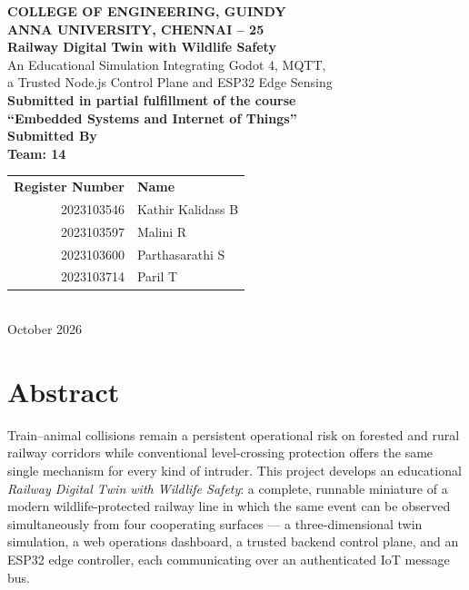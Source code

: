 \begin{titlepage}
\begin{center}

{\large\bfseries COLLEGE OF ENGINEERING, GUINDY}\\[2pt]
{\normalsize\bfseries ANNA UNIVERSITY, CHENNAI -- 25}\\[26pt]

{\Large\bfseries Railway Digital Twin with Wildlife Safety}\\[4pt]
{\normalsize An Educational Simulation Integrating Godot 4, MQTT,\\ a Trusted Node.js Control Plane and ESP32 Edge Sensing}\\[26pt]

{\normalsize\bfseries Submitted in partial fulfillment of the course}\\[2pt]
{\normalsize\bfseries ``Embedded Systems and Internet of Things''}\\[26pt]

{\normalsize\bfseries Submitted By}\\[4pt]
\textbf{Team: 14}\\[10pt]
{\renewcommand{\arraystretch}{1.35}%
\begin{tabular}{r l}
\textbf{Register Number} & \textbf{Name} \\
2023103546 & \; Kathir Kalidass B \\
2023103597 & \; Malini R \\
2023103600 & \; Parthasarathi S \\
2023103714 & \; Paril T \\
\end{tabular}}\\[22pt]

{\normalsize October 2026}

\end{center}
\end{titlepage}

\setcounter{page}{2}

\chapter*{Abstract}

Train--animal collisions remain a persistent operational risk on forested and
rural railway corridors while conventional level-crossing protection offers the
same single mechanism for every kind of intruder. This project develops an
educational \emph{Railway Digital Twin with Wildlife Safety}: a complete,
runnable miniature of a modern wildlife-protected railway line in which the
same event can be observed simultaneously from four cooperating surfaces --- a
three-dimensional twin simulation, a web operations dashboard, a trusted
backend control plane, and an ESP32 edge controller, each communicating over
an authenticated IoT message bus.

